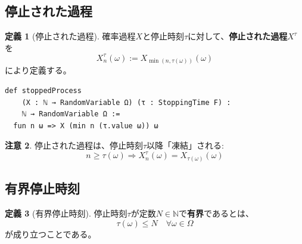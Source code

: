 \documentclass[a4paper,12pt]{ltjsarticle}
\theoremstyle{definition}
\newtheorem{definition}{定義}[section]
\newtheorem{remark}[definition]{注意}
\begin{document}
\subsection{停止された過程}

\begin{definition}[停止された過程]
確率過程$X$と停止時刻$\tau$に対して、\textbf{停止された過程}$X^\tau$を
\[
  X^\tau_n(\omega) := X_{\min(n, \tau(\omega))}(\omega)
\]
により定義する。
\end{definition}

\begin{leanbox}
\begin{verbatim}
def stoppedProcess
    (X : ℕ → RandomVariable Ω) (τ : StoppingTime F) :
    ℕ → RandomVariable Ω :=
  fun n ω => X (min n (τ.value ω)) ω
\end{verbatim}
\end{leanbox}

\begin{remark}
停止された過程は、停止時刻$\tau$以降「凍結」される:
\[
  n \geq \tau(\omega) \Rightarrow X^\tau_n(\omega) = X_{\tau(\omega)}(\omega)
\]
\end{remark}

\begin{center}
\end{center}

\subsection{有界停止時刻}

\begin{definition}[有界停止時刻]
停止時刻$\tau$が定数$N \in \mathbb{N}$で\textbf{有界}であるとは、
\[
  \tau(\omega) \leq N \quad \forall \omega \in \Omega
\]
が成り立つことである。
\end{definition}
\end{document}
